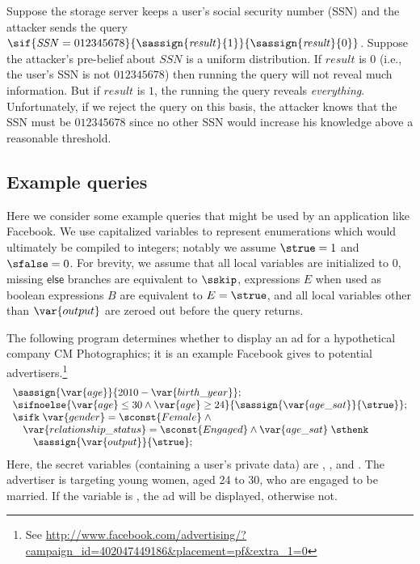 Suppose the storage server keeps a user's social security number (SSN)
and the attacker sends the query $\sif{\mathit{SSN} =
  012345678}{\sassign{\mathit{result}}{1}}{\sassign{\mathit{result}}{0}}$.
Suppose the attacker's pre-belief about $\mathit{SSN}$ is a uniform
distribution.  If $\mathit{result}$ is $0$ (i.e., the user's SSN is
not $012345678$) then running the query will not reveal much
information.  But if $\mathit{result}$ is $1$, the running the query
reveals \emph{everything}.  Unfortunately, if we reject the query on
this basis, the attacker knows that the SSN must be $012345678$ since
no other SSN would increase his knowledge above a reasonable
threshold.

\subsection{Example queries}
\label{sec:examples}

Here we consider some example queries that might be used by an
application like Facebook.  
We use capitalized variables to represent enumerations which would
ultimately be compiled to integers; notably we assume $\strue = 1$ and
$\sfalse = 0$.  For brevity, we assume that all local variables are
initialized to 0, missing $\mathsf{else}$ branches are equivalent to
$\sskip$, expressions $E$ when used as boolean expressions $B$
are equivalent to $E = \strue$, and all local variables other than
$\var{output}$ are zeroed out before the query returns.

\begin{example}
\label{ex1}
The following program determines whether to display an ad for a
hypothetical company CM Photographics; it is an example Facebook
gives to potential advertisers.\footnote{See
  \url{http://www.facebook.com/advertising/?campaign_id=402047449186&placement=pf&extra_1=0}}
\begin{displaymath}
\begin{array}{l}
\sassign{\var{age}}{2010 - \var{birth\_year}}; \\
\sifnoelse{\var{age} \leq 30 \wedge \var{age} \geq
  24}{\sassign{\var{age\_sat}}{\strue}};\\
\sifk\; \var{gender} = \sconst{Female}\; \wedge \\
\quad \var{relationship\_status} = \sconst{Engaged} \wedge \var{age\_sat}\; \sthenk \\
\quad \quad \sassign{\var{output}}{\strue};\\
\end{array}
\end{displaymath}
Here, the secret variables (containing a user's private data) are
, , and 
.  The advertiser is targeting young women,
aged 24 to 30, who are engaged to be married.  If the 
variable is \strue, the ad will be displayed, otherwise not.
\end{example}

